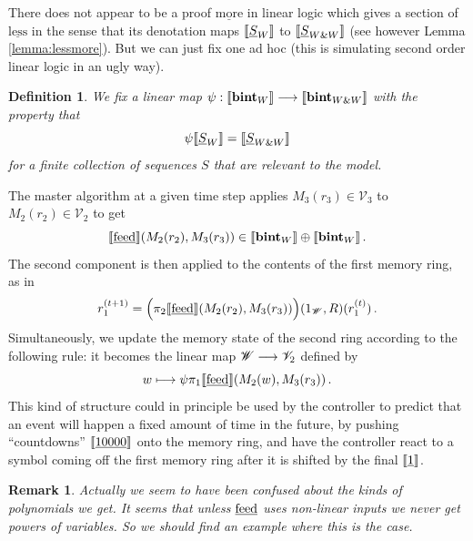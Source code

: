 \documentclass[english,letter paper,12pt,leqno]{article}
\theoremstyle{example}
\newtheorem{definition}[theorem]{Definition}
\newtheorem{remark}[theorem]{Remark}
\numberwithin{equation}{section}
\begin{document}
There does not appear to be a proof $\underline{\mathrm{more}}$ in linear logic which gives a section of $\underline{\mathrm{less}}$ in the sense that its denotation maps $\llbracket \underline{S}_W \rrbracket$ to $\llbracket \underline{S}_{W \& W} \rrbracket$ (see however Lemma \ref{lemma:lessmore}). But we can just fix one ad hoc (this is simulating second order linear logic in an ugly way).

\begin{definition} We fix a linear map $\psi: \llbracket \textbf{bint}_W \rrbracket \longrightarrow \llbracket \textbf{bint}_{W \& W} \rrbracket$ with the property that
\[
\psi \llbracket \underline{S}_W \rrbracket = \llbracket \underline{S}_{W \& W} \rrbracket
\]
for a finite collection of sequences $S$ that are relevant to the model.
\end{definition}

The master algorithm at a given time step applies $M_3(r_3) \in \mathscr{V}_3$ to $M_2(r_2) \in \mathscr{V}_2$ to get
\[
\llbracket \underline{\textup{feed}} \rrbracket( M_2(r_2), M_3(r_3)) \in \llbracket \textbf{bint}_W \rrbracket \oplus \llbracket \textbf{bint}_W \rrbracket\,.
\]
The second component is then applied to the contents of the first memory ring, as in
\[
r_1^{(t+1)} = \Big( \pi_2\llbracket \underline{\textup{feed}} \rrbracket( M_2(r_2), M_3(r_3)) \Big)(1_{\mathscr{W}}, R)(r_1^{(t)})\,.
\]
Simultaneously, we update the memory state of the second ring according to the following rule: it becomes the linear map $\mathscr{W} \longrightarrow \mathscr{V}_2$ defined by
\[
w \longmapsto \psi \pi_1\llbracket \underline{\textup{feed}} \rrbracket( M_2(w), M_3(r_3))\,.
\]
This kind of structure could in principle be used by the controller to predict that an event will happen a fixed amount of time in the future, by pushing ``countdowns'' $\llbracket \underline{10000} \rrbracket$ onto the memory ring, and have the controller react to a symbol coming off the first memory ring after it is shifted by the final $\llbracket \underline{1} \rrbracket$.

\begin{remark} Actually we seem to have been confused about the kinds of polynomials we get. It seems that unless $\underline{\textup{feed}}$ uses non-linear inputs we never get powers of variables. So we should find an example where this is the case.
\end{remark}
\end{document}
